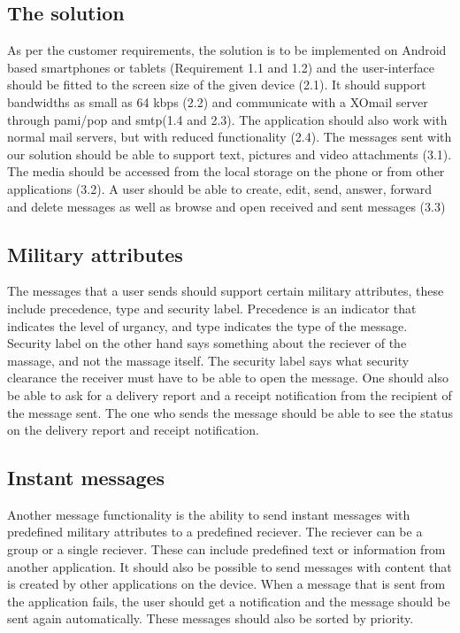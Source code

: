 \subsection{The solution}
As per the customer requirements, the solution is to be implemented on Android based smartphones or tablets (Requirement 1.1 and 1.2) and the user-interface should be fitted to the screen size of the given device (2.1). It should support bandwidths as small as 64 kbps (2.2) and communicate with a XOmail server through \gls{pami}/\gls{pop} and \gls{smtp}(1.4 and 2.3). The application should also work with normal mail servers, but with reduced functionality (2.4).
\newline
\newline
The messages sent with our solution should be able to support text, pictures and video attachments (3.1). The media should be accessed from the local storage on the phone or from other applications (3.2). A user should be able to create, edit, send, answer, forward and delete messages as well as browse and open received and sent messages (3.3)

\subsection{Military attributes}
The messages that a user sends should support certain military attributes, these include precedence, type and security label. Precedence is an indicator that indicates the level of urgancy, and type indicates the type of the message. Security label on the other hand says something about the reciever of the massage, and not the massage itself. The security label says what security clearance the receiver must have to be able to open the message.
\newline
\newline
One should also be able to ask for a delivery report and a receipt notification from the recipient of the message sent. The one who sends the message should be able to see the status on the delivery report and receipt notification.

\subsection{Instant messages}
Another message functionality is the ability to send instant messages with predefined military attributes to a predefined reciever. The reciever can be a group or a single reciever. These can include predefined text or information from another application. It should also be possible to send messages with content that is created by other applications on the device.
\newline
\newline
When a message that is sent from the application fails, the user should get a notification and the message should be sent again automatically. These messages should also be sorted by priority.

